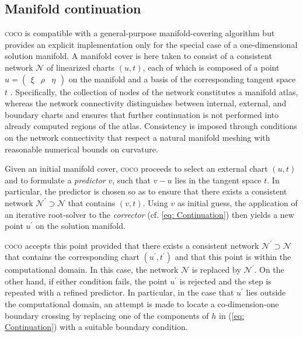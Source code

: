 \documentclass{article}
\begin{document}
\subsection{Manifold continuation}

\textsc{coco} is compatible with a general-purpose manifold-covering
algorithm but provides an explicit implementation only for the special case
of a one-dimensional solution manifold. A manifold cover is here taken to
consist of a consistent network $\mathcal{N}$ of linearized charts $\left(
u,t\right) $, each of which is composed of a point $u=\left( 
\begin{array}{ccc}
\xi & \rho & \eta%
\end{array}%
\right) $ on the manifold and a basis of the corresponding tangent space $t$%
. Specifically, the collection of nodes of the network constitutes a
manifold atlas, whereas the network connectivity distinguishes between
internal, external, and boundary charts and ensures that further
continuation is not performed into already computed regions of the atlas.
Consistency is imposed through conditions on the network connectivity that
respect a natural manifold meshing with reasonable numerical bounds on
curvature.

Given an initial manifold cover, \textsc{coco} proceeds to select an
external chart $\left( u,t\right) $ and to formulate a \emph{predictor} $v$,
such that $v-u$ lies in the tangent space $t$. In particular, the predictor
is chosen so as to ensure that there exists a consistent network $\mathcal{N}%
^{\prime }\supset \mathcal{N}$ that contains $\left( v,t\right) $. Using $v$
as initial guess, the application of an iterative root-solver to the \emph{%
corrector} (cf. \ref{eq: Continuation}) then yields a new point $u^{\prime }$
on the solution manifold.

\textsc{coco} accepts this point provided that there exists a consistent
network $\mathcal{N}^{\prime }\supset \mathcal{N}$ that contains the
corresponding chart $\left( u^{\prime },t^{\prime }\right) $ and that this
point is within the computational domain. In this case, the network $%
\mathcal{N}$ is replaced by $\mathcal{N}^{\prime }$. On the other hand, if
either condition fails, the point $u^{\prime }$ is rejected and the step is
repeated with a refined predictor. In particular, in the case that $%
u^{\prime }$ lies outside the computational domain, an attempt is made to
locate a co-dimension-one boundary crossing by replacing one of the
components of $h$ in (\ref{eq: Continuation}) with a suitable boundary
condition.
\end{document}
